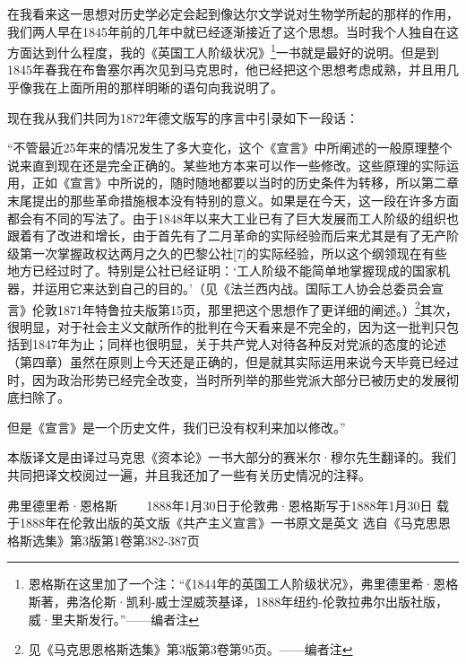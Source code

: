 \documentclass[UTF8,zihao=-4,a4paper]{ctexart}
\begin{document}
在我看来这一思想对历史学必定会起到像达尔文学说对生物学所起的那样的作用，我们两人早在1845年前的几年中就已经逐渐接近了这个思想。当时我个人独自在这方面达到什么程度，我的《英国工人阶级状况》\footnote{恩格斯在这里加了一个注：“《1844年的英国工人阶级状况》，弗里德里希·恩格斯著，弗洛伦斯·凯利-威士涅威茨基译，1888年纽约-伦敦拉弗尔出版社版，威·里夫斯发行。”——编者注}一书就是最好的说明。但是到1845年春我在布鲁塞尔再次见到马克思时，他已经把这个思想考虑成熟，并且用几乎像我在上面所用的那样明晰的语句向我说明了。\par
现在我从我们共同为1872年德文版写的序言中引录如下一段话：\par
“不管最近25年来的情况发生了多大变化，这个《宣言》中所阐述的一般原理整个说来直到现在还是完全正确的。某些地方本来可以作一些修改。这些原理的实际运用，正如《宣言》中所说的，随时随地都要以当时的历史条件为转移，所以第二章末尾提出的那些革命措施根本没有特别的意义。如果是在今天，这一段在许多方面都会有不同的写法了。由于1848年以来大工业已有了巨大发展而工人阶级的组织也跟着有了改进和增长，由于首先有了二月革命的实际经验而后来尤其是有了无产阶级第一次掌握政权达两月之久的巴黎公社[7]的实际经验，所以这个纲领现在有些地方已经过时了。特别是公社已经证明：‘工人阶级不能简单地掌握现成的国家机器，并运用它来达到自己的目的。’（见《法兰西内战。国际工人协会总委员会宣言》伦敦1871年特鲁拉夫版第15页，那里把这个思想作了更详细的阐述。）\footnote{见《马克思恩格斯选集》第3版第3卷第95页。——编者注}其次，很明显，对于社会主义文献所作的批判在今天看来是不完全的，因为这一批判只包括到1847年为止；同样也很明显，关于共产党人对待各种反对党派的态度的论述（第四章）虽然在原则上今天还是正确的，但是就其实际运用来说今天毕竟已经过时，因为政治形势已经完全改变，当时所列举的那些党派大部分已被历史的发展彻底扫除了。\par
但是《宣言》是一个历史文件，我们已没有权利来加以修改。”\par
本版译文是由译过马克思《资本论》一书大部分的赛米尔·穆尔先生翻译的。我们共同把译文校阅过一遍，并且我还加了一些有关历史情况的注释。\par
弗里德里希·恩格斯 
 　　1888年1月30日于伦敦弗·恩格斯写于1888年1月30日 
 载于1888年在伦敦出版的英文版《共产主义宣言》一书原文是英文 
 选自《马克思恩格斯选集》第3版第1卷第382-387页\par
\end{document}

